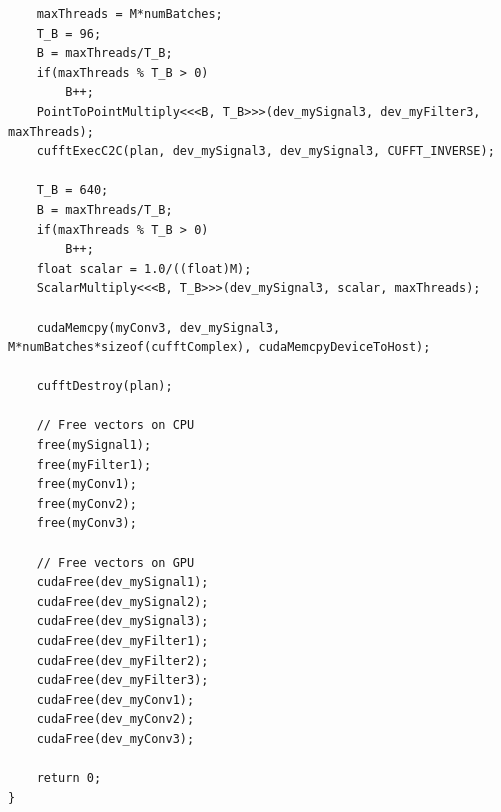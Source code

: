 \begin{lstlisting}
	maxThreads = M*numBatches;
	T_B = 96;
	B = maxThreads/T_B;
	if(maxThreads % T_B > 0)
		B++;
	PointToPointMultiply<<<B, T_B>>>(dev_mySignal3, dev_myFilter3, maxThreads);
	cufftExecC2C(plan, dev_mySignal3, dev_mySignal3, CUFFT_INVERSE);

	T_B = 640;
	B = maxThreads/T_B;
	if(maxThreads % T_B > 0)
		B++;
	float scalar = 1.0/((float)M);
	ScalarMultiply<<<B, T_B>>>(dev_mySignal3, scalar, maxThreads);

	cudaMemcpy(myConv3, dev_mySignal3, M*numBatches*sizeof(cufftComplex), cudaMemcpyDeviceToHost);

	cufftDestroy(plan);

	// Free vectors on CPU
	free(mySignal1);
	free(myFilter1);
	free(myConv1);
	free(myConv2);
	free(myConv3);

	// Free vectors on GPU
	cudaFree(dev_mySignal1);
	cudaFree(dev_mySignal2);
	cudaFree(dev_mySignal3);
	cudaFree(dev_myFilter1);
	cudaFree(dev_myFilter2);
	cudaFree(dev_myFilter3);
	cudaFree(dev_myConv1);
	cudaFree(dev_myConv2);
	cudaFree(dev_myConv3);

	return 0;
}
\end{lstlisting}
\doublespacing